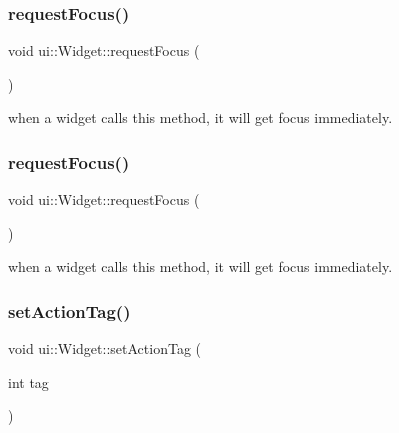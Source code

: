 \mbox{\label{classui_1_1Widget_a3f37229935bf05eeb4e08fe70250c52b}} 
\subsubsection{\texorpdfstring{request\+Focus()}{requestFocus()}\hspace{0.1cm}{\footnotesize\ttfamily [1/2]}}
{\footnotesize\ttfamily void ui\+::\+Widget\+::request\+Focus (\begin{DoxyParamCaption}{ }\end{DoxyParamCaption})}

when a widget calls this method, it will get focus immediately. \mbox{\label{classui_1_1Widget_a3f37229935bf05eeb4e08fe70250c52b}} 
\subsubsection{\texorpdfstring{request\+Focus()}{requestFocus()}\hspace{0.1cm}{\footnotesize\ttfamily [2/2]}}
{\footnotesize\ttfamily void ui\+::\+Widget\+::request\+Focus (\begin{DoxyParamCaption}{ }\end{DoxyParamCaption})}

when a widget calls this method, it will get focus immediately. \mbox{\label{classui_1_1Widget_a49aa79c6bdbcbb4d41d02e8d424826cb}} 
\subsubsection{\texorpdfstring{set\+Action\+Tag()}{setActionTag()}\hspace{0.1cm}{\footnotesize\ttfamily [1/2]}}
{\footnotesize\ttfamily void ui\+::\+Widget\+::set\+Action\+Tag (\begin{DoxyParamCaption}\item[{int}]{tag }\end{DoxyParamCaption})}

